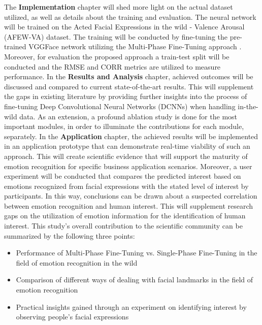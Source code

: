\newline\newline
The \textbf{Implementation} chapter will shed more light on the actual dataset utilized, as well as details about the training and evaluation. The neural network will be trained on the Acted Facial Expressions in the wild - Valence Arousal (AFEW-VA) dataset. The training will be conducted by fine-tuning the pre-trained VGGFace network utilizing the Multi-Phase Fine-Tuning approach \citep{Sarhan:2020:MultiPhaseFineTuning}. Moreover, for evaluation the proposed approach a train-test split will be conducted and the RMSE and CORR metrics are utilized to measure performance.
\newline\newline
In the \textbf{Results and Analysis} chapter, achieved outcomes will be discussed and compared to current state-of-the-art results. This will supplement the gaps in existing literature by providing further insights into the process of fine-tuning Deep Convolutional Neural Networks (DCNNs) when handling in-the-wild data. As an extension, a profound ablation study is done for the most important modules, in order to illuminate the contributions for each module, separately.
\newline\newline
In the \textbf{Application} chapter, the achieved results will be implemented in an application prototype that can demonstrate real-time viability of such an approach. This will create scientific evidence that will support the maturity of emotion recognition for specific business application scenarios. Moreover, a user experiment will be conducted that compares the predicted interest based on emotions recognized from facial expressions with the stated level of interest by participants. In this way, conclusions can be drawn about a suspected correlation between emotion recognition and human interest. This will supplement research gaps on the utilization of emotion information for the identification of human interest. 
\newline\newline
This study's overall contribution to the scientific community can be summarized by the following three points:
\begin{itemize}
    \item Performance of Multi-Phase Fine-Tuning vs. Single-Phase Fine-Tuning in the field of emotion recognition in the wild
    \item Comparison of different ways of dealing with facial landmarks in the field of emotion recognition
    \item Practical insights gained through an experiment on identifying interest by observing people's facial expressions
\end{itemize}